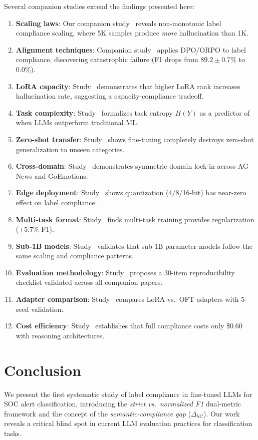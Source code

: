 \documentclass[journal]{IEEEtran}
\begin{document}
Several companion studies extend the findings presented here:
\begin{enumerate}
\item \textbf{Scaling laws}: Our companion study~\cite{p6} reveals non-monotonic label compliance scaling, where 5K samples produce \emph{more} hallucination than 1K.
\item \textbf{Alignment techniques}: Companion study~\cite{p9} applies DPO/ORPO to label compliance, discovering catastrophic failure (F1 drops from $89.2 \pm 0.7$\% to 0.0\%).
\item \textbf{LoRA capacity}: Study~\cite{p22} demonstrates that higher LoRA rank increases hallucination rate, suggesting a capacity-compliance tradeoff.
\item \textbf{Task complexity}: Study~\cite{p8} formalizes task entropy $H(Y)$ as a predictor of when LLMs outperform traditional ML.
\item \textbf{Zero-shot transfer}: Study~\cite{p18} shows fine-tuning completely destroys zero-shot generalization to unseen categories.
\item \textbf{Cross-domain}: Study~\cite{p20} demonstrates symmetric domain lock-in across AG News and GoEmotions.
\item \textbf{Edge deployment}: Study~\cite{p23} shows quantization (4/8/16-bit) has near-zero effect on label compliance.
\item \textbf{Multi-task format}: Study~\cite{p15} finds multi-task training provides regularization (+5.7\% F1).
\item \textbf{Sub-1B models}: Study~\cite{p21} validates that sub-1B parameter models follow the same scaling and compliance patterns.
\item \textbf{Evaluation methodology}: Study~\cite{p19} proposes a 30-item reproducibility checklist validated across all companion papers.
\item \textbf{Adapter comparison}: Study~\cite{p14} compares LoRA vs.\ OFT adapters with 5-seed validation.
\item \textbf{Cost efficiency}: Study~\cite{p7} establishes that full compliance costs only \$0.60 with reasoning architectures.
\end{enumerate}

\section{Conclusion}

We present the first systematic study of label compliance in fine-tuned LLMs for SOC alert classification, introducing the \emph{strict vs.\ normalized F1} dual-metric framework and the concept of the \emph{semantic-compliance gap} ($\Delta_\text{SC}$). Our work reveals a critical blind spot in current LLM evaluation practices for classification tasks.
\end{document}
